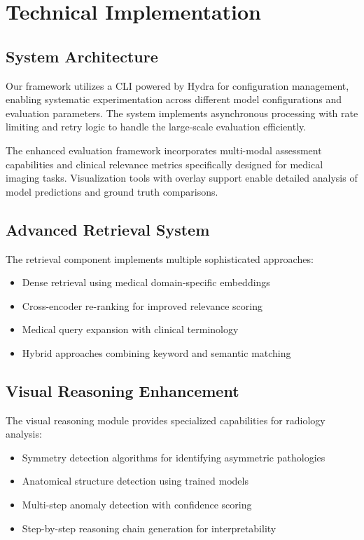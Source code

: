 \documentclass[runningheads]{llncs}
\begin{document}
\section{Technical Implementation}

\subsection{System Architecture}

Our framework utilizes a CLI powered by Hydra for configuration management, enabling systematic experimentation across different model configurations and evaluation parameters. The system implements asynchronous processing with rate limiting and retry logic to handle the large-scale evaluation efficiently.

The enhanced evaluation framework incorporates multi-modal assessment capabilities and clinical relevance metrics specifically designed for medical imaging tasks. Visualization tools with overlay support enable detailed analysis of model predictions and ground truth comparisons.

\subsection{Advanced Retrieval System}

The retrieval component implements multiple sophisticated approaches:
\begin{itemize}
\item Dense retrieval using medical domain-specific embeddings
\item Cross-encoder re-ranking for improved relevance scoring
\item Medical query expansion with clinical terminology
\item Hybrid approaches combining keyword and semantic matching
\end{itemize}

\subsection{Visual Reasoning Enhancement}

The visual reasoning module provides specialized capabilities for radiology analysis:
\begin{itemize}
\item Symmetry detection algorithms for identifying asymmetric pathologies
\item Anatomical structure detection using trained models
\item Multi-step anomaly detection with confidence scoring
\item Step-by-step reasoning chain generation for interpretability
\end{itemize}
\end{document}
